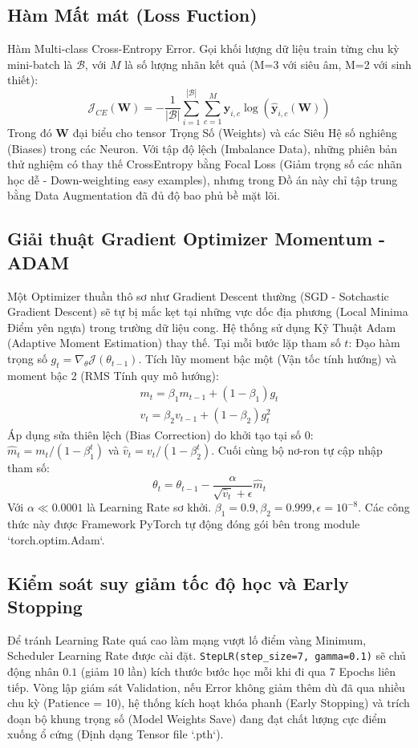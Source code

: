 \documentclass[conference,a4paper]{IEEEtran}
\begin{document}
\subsection{Hàm Mất mát (Loss Fuction)}
Hàm Multi-class Cross-Entropy Error. Gọi khối lượng dữ liệu train từng chu kỳ mini-batch là $\mathcal{B}$, với $M$ là số lượng nhãn kết quả (M=3 với siêu âm, M=2 với sinh thiết):
\begin{equation}
\mathcal{J}_{CE}(\mathbf{W}) = -\frac{1}{|\mathcal{B}|} \sum_{i=1}^{|\mathcal{B}|} \sum_{c=1}^{M} \mathbf{y}_{i, c} \log(\hat{\mathbf{y}}_{i, c}(\mathbf{W}))
\end{equation}
Trong đó $\mathbf{W}$ đại biểu cho tensor Trọng Số (Weights) và các Siêu Hệ số nghiêng (Biases) trong các Neuron.
Với tập độ lệch (Imbalance Data), những phiên bản thử nghiệm có thay thế CrossEntropy bằng Focal Loss (Giảm trọng số các nhãn học dễ - Down-weighting easy examples), nhưng trong Đồ án này chỉ tập trung bằng Data Augmentation đã đủ độ bao phủ bề mặt lõi.

\subsection{Giải thuật Gradient Optimizer Momentum - ADAM}
Một Optimizer thuần thô sơ như Gradient Descent thường (SGD - Sotchastic Gradient Descent) sẽ tự bị mắc kẹt tại những vực dốc địa phương (Local Minima Điểm yên ngựa) trong trường dữ liệu cong.
Hệ thống sử dụng Kỹ Thuật Adam (Adaptive Moment Estimation) thay thế. Tại mỗi bước lặp tham số $t$:
Đạo hàm trọng số $g_t = \nabla_\theta \mathcal{J}(\theta_{t-1})$.
Tích lũy moment bậc một (Vận tốc tính hướng) và moment bậc 2 (RMS Tính quy mô hướng):
\begin{eqnarray}
m_t = \beta_1 m_{t-1} + (1 - \beta_1) g_t \\
v_t = \beta_2 v_{t-1} + (1 - \beta_2) g_t^2
\end{eqnarray}
Áp dụng sửa thiên lệch (Bias Correction) do khởi tạo tại số 0: $\hat{m}_t = m_t / (1 - \beta_1^t)$ và $\hat{v}_t = v_t / (1 - \beta_2^t)$.
Cuối cùng bộ nơ-ron tự cập nhập tham số:
\begin{equation}
\theta_t = \theta_{t-1} - \frac{\alpha}{\sqrt{\hat{v}_t} + \epsilon} \hat{m}_t
\end{equation}
Với $\alpha \ll 0.0001$ là Learning Rate sơ khởi. $\beta_1=0.9, \beta_2=0.999, \epsilon=10^{-8}$. Các công thức này được Framework PyTorch tự động đóng gói bên trong module `torch.optim.Adam`.

\subsection{Kiểm soát suy giảm tốc độ học và Early Stopping}
Để tránh Learning Rate quá cao làm mạng vượt lố điểm vàng Minimum, Scheduler Learning Rate được cài đặt. \texttt{StepLR(step\_size=7, gamma=0.1)} sẽ chủ động nhân $0.1$ (giảm $10$ lần) kích thước bước học mỗi khi đi qua 7 Epochs liên tiếp.
Vòng lập giám sát Validation, nếu Error không giảm thêm dù đã qua nhiều chu kỳ (Patience = 10), hệ thống kích hoạt khóa phanh (Early Stopping) và trích đoạn bộ khung trọng số (Model Weights Save) đang đạt chất lượng cực điểm xuống ổ cứng (Định dạng Tensor file `.pth`).
\end{document}
